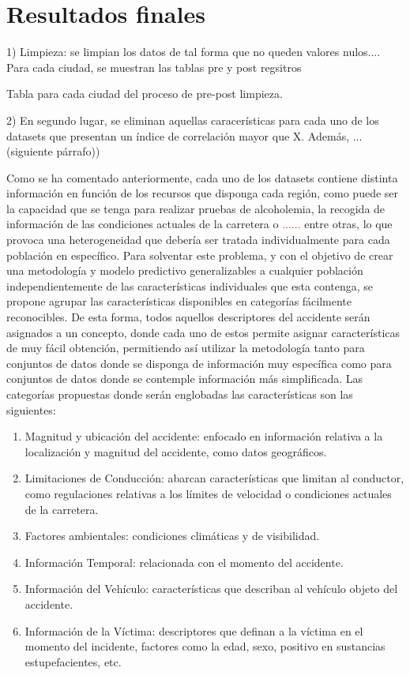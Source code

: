 \documentclass{uathesis-es}
\begin{document}
{	\section{Resultados finales}
	
	
	1) Limpieza:
	se limpian los datos de tal forma que no queden valores nulos.... Para cada ciudad, se muestran las tablas pre y post regsitros
	
	Tabla para cada ciudad del proceso de pre-post limpieza.
	
	
	2) En segundo lugar, se eliminan aquellas caracerísticas para cada uno de los datasets que presentan un índice de correlación mayor que X. Además, ... (siguiente párrafo))
	
	
	Como se ha comentado anteriormente, cada uno de los datasets contiene distinta información en función de los recursos que disponga cada región, como puede ser la capacidad que se tenga para realizar pruebas de alcoholemia, la recogida de información de las condiciones actuales de la carretera o \textcolor{red}{......} entre otras, lo que provoca una heterogeneidad que debería ser tratada individualmente para cada población en específico. Para solventar este problema, y con el objetivo de crear una metodología y modelo predictivo generalizables a cualquier población independientemente de las características individuales que esta contenga, se propone agrupar las características disponibles en categorías fácilmente reconocibles. De esta forma, todos aquellos descriptores del accidente serán asignados a un concepto, donde cada uno de estos permite asignar características de muy fácil obtención, permitiendo así utilizar la metodología tanto para conjuntos de datos donde se disponga de información muy específica como para conjuntos de datos donde se contemple información más simplificada. Las categorías propuestas donde serán englobadas las características son las siguientes:
	
	\begin{enumerate}
		\item Magnitud y ubicación del accidente: enfocado en información relativa a la localización y magnitud del accidente, como datos geográficos.
		\item Limitaciones de Conducción: abarcan características que limitan al conductor, como regulaciones relativas a los límites de velocidad o condiciones actuales de la carretera.
		\item Factores ambientales: condiciones climáticas y de visibilidad.
		\item Información Temporal: relacionada con el momento del accidente.
		\item Información del Vehículo: características que describan al vehículo objeto del accidente.
		\item Información de la Víctima: descriptores que definan a la víctima en el momento del incidente, factores como la edad, sexo, positivo en sustancias estupefacientes, etc.
	\end{enumerate}
	
}
\end{document}
